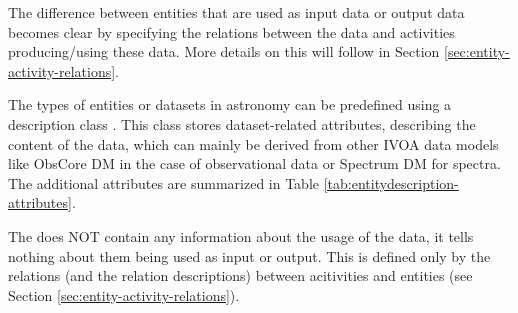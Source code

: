 
The difference between entities that are used as input data or output data 
becomes clear by specifying the relations between the data and activities producing/using these data.
More details on this will follow in Section \ref{sec:entity-activity-relations}.

The types of entities or datasets in astronomy can be predefined using a description
class . %
This class stores dataset-related 
attributes, describing the content of the data, which can mainly be derived from 
other IVOA data models like ObsCore DM in the case of observational data or 
Spectrum DM for spectra. 
The additional attributes are summarized in Table 
\ref{tab:entitydescription-attributes}.

The  does NOT contain any information about the usage 
of the data, it tells nothing about them being used as input or output. This is 
defined only by the relations (and the relation descriptions) between acitivities
and entities (see Section \ref{sec:entity-activity-relations}).



